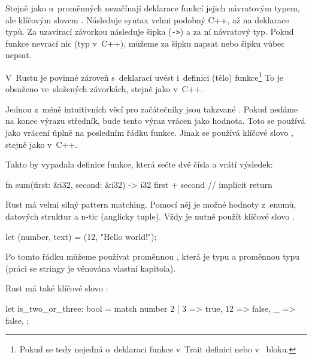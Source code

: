 \documentclass[main.tex]{subfiles}
\begin{document}

Stejně jako u~proměnných nezačínají deklarace funkcí jejich návratovým typem, ale
klíčovým slovem . Následuje syntax velmi podobný C++, až na  deklarace typů. Za uzavírací závorkou následuje šipka (\texttt{->}) a za ní
návratový typ. Pokud funkce nevrací nic (typ  v~C++), můžeme za šipku napsat
 \irust{()} nebo šipku vůbec nepsat.

V~Rustu je povinné zároveň s~deklarací uvést i~definici (tělo) funkce\footnote{Pokud
    se tedy nejedná o~deklaraci funkce v~Trait definici nebo v~ bloku.
} To je obsaženo ve~složených závorkách, stejně jako v~C++.

Jednou z~méně intuitivních věcí pro začátečníky jsou takzvané .
Pokud nedáme na konec výrazu středník, bude tento výraz vrácen jako hodnota. Toto se
používá jako vrácení úplně na posledním řádku funkce. Jinak se používá klíčové slovo
, stejně jako v~C++. \cite[sekce\,3.3]{thebook}

Takto by vypadala definice funkce, která sečte dvě čísla a vrátí výsledek:

\obrazek
\begin{rustcode}
    fn sum(first: &i32, second: &i32) -> i32 {
        first + second // implicit return
    }
\end{rustcode}


Rust má velmi silný pattern matching. Pomocí něj je možné  hodnoty
z~enumů, datových struktur a n-tic (anglicky tuple). Vždy je nutné použít klíčové
slovo . \cite[sekce\,18.1]{thebook}

\obrazek
\begin{rustcode}
    let (number, text) = (12, "Hello world!");
\end{rustcode}

Po tomto řádku můžeme používat proměnnou , která je typu  a
proměnnou  typu  (práci se stringy je věnována vlastní kapitola).

Rust má také klíčové slovo :

\obrazek
\begin{rustcode}
    let is_two_or_three: bool = match number {
        2 | 3 => true,
        12 => false,
        _ => false,
    };
\end{rustcode}
\end{document}
